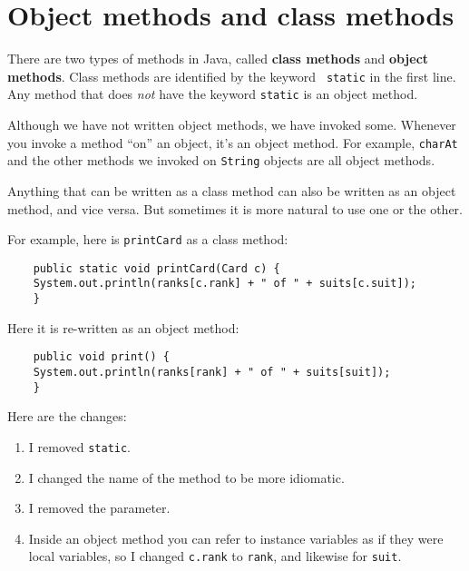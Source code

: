 \documentclass[12pt]{book}
\theoremstyle{definition}
\begin{document}
\section{Object methods and class methods}

There are two types of methods in Java, called {\bf class methods} and
{\bf object methods}.  Class methods are identified by the keyword {\tt
  static} in the first line.  Any method that does {\em not} have the
keyword {\tt static} is an object method.

Although we have not written object methods, we have invoked some.
Whenever you invoke a method ``on'' an object, it's an object method.
For example, {\tt charAt} and the other methods we invoked on {\tt String}
objects are all object methods.

Anything that can be written as a class method can also be written as an
object method, and vice versa.  But sometimes it is more natural to
use one or the other.

For example, here is {\tt printCard} as a class method:

\begin{lstlisting}
    public static void printCard(Card c) {
	System.out.println(ranks[c.rank] + " of " + suits[c.suit]);
    }
\end{lstlisting}

Here it is re-written as an object method:

\begin{lstlisting}
    public void print() {
	System.out.println(ranks[rank] + " of " + suits[suit]);
    }
\end{lstlisting}

Here are the changes:

\begin{enumerate}

\item I removed {\tt static}.

\item I changed the name of the method to be more idiomatic.

\item I removed the parameter.

\item Inside an object method you can refer to instance variables
as if they were local variables, so I changed {\tt c.rank} to {\tt rank},
and likewise for {\tt suit}.

\end{enumerate}
\end{document}
